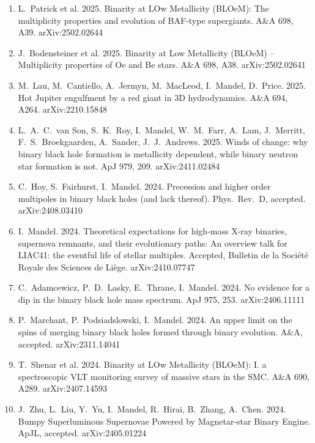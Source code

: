 \documentclass[margin,line]{res}
\begin{document}
\begin{resume}
\begin{enumerate}
\item L.~Patrick et al. 2025. Binarity at LOw Metallicity (BLOeM): The multiplicity properties and evolution of BAF-type supergiants.   A\&A 698, A39.  arXiv:2502.02644

\item J.~Bodensteiner et al.  2025.  Binarity at Low Metallicity (BLOeM) -- Multiplicity properties of Oe and Be stars.  A\&A 698, A38.  arXiv:2502.02641

\item M.~Lau, M.~Cantiello, A.~Jermyn, M.~MacLeod, I.~Mandel, D.~Price.  2025.  Hot Jupiter engulfment by a red giant in 3D hydrodynamics.  A\&A 694, A264.  arXiv:2210.15848

\item L.~A.~C.~van Son, S.~K.~Roy, I.~Mandel, W.~M.~Farr, A.~Lam, J.~Merritt, F.~S.~Broekgaarden, A.~Sander, J.~J.~Andrews.  2025. Winds of change: why binary black hole formation is metallicity dependent, while binary neutron star formation is not.  ApJ 979, 209.  arXiv:2411.02484

\item C.~Hoy, S.~Fairhurst, I.~Mandel.  2024. Precession and higher order multipoles in binary black holes (and lack thereof). Phys.~Rev.~D, accepted.  arXiv:2408.03410

\item I.~Mandel. 2024. Theoretical expectations for high-mass X-ray binaries, supernova remnants, and their evolutionary paths: An overview talk for LIAC41: the eventful life of stellar multiples.  Accepted, Bulletin de la Société Royale des Sciences de Liège. arXiv:2410.07747

\item C.~Adamcewicz, P.~D.~Lasky, E.~Thrane, I.~Mandel. 2024. No evidence for a dip in the binary black hole mass spectrum.  ApJ 975, 253.  arXiv:2406.11111

\item P.~Marchant, P.~Podsiadslowski, I.~Mandel.  2024.  An upper limit on the spins of merging binary black holes formed through binary evolution. A\&A, accepted.  arXiv:2311.14041

\item T.~Shenar et al. 2024. Binarity at LOw Metallicity (BLOeM): I. a spectroscopic VLT monitoring survey of massive stars in the SMC.  A\&A 690, A289.  arXiv:2407.14593

\item J.~Zhu, L.~Liu, Y.~Yu, I.~Mandel, R.~Hirai, B.~Zhang, A.~Chen.  2024.  Bumpy Superluminous Supernovae Powered by Magnetar-star Binary Engine.  ApJL, accepted.  arXiv:2405.01224 


\end{enumerate}
\end{resume}
\end{document}
